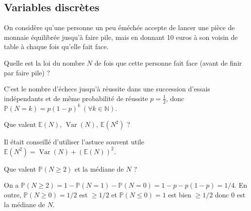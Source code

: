 \subsection{Variables discrètes}

On considère qu'une personne un peu éméchée accepte de lancer une pièce de monnaie équilibrée jusqu'à faire pile, mais en donnant 10 euros à son voisin de table à chaque fois qu'elle fait face.

\begin{question}
Quelle est la loi du nombre $N$ de fois que cette personne fait face (avant de finir par faire pile) ?
\begin{answers}
\end{answers}
\begin{explanations}
C'est le nombre d'échecs jusqu'à  réussite dans une succession d'essais indépendants et de même probabilité de réussite $p=\frac 1 2$, donc $\mathbb{P}(N=k)=p(1-p)^{k} \ (\forall k\in\mathbb{N})$.
\end{explanations}
\end{question}


\begin{question}
Que valent $\mathbb{E}(N)$, $\operatorname{Var}(N)$, $\mathbb{E}(N^2)$ ? 
\begin{answers}
\end{answers}
\begin{explanations}
Il était conseillé  d'utiliser l'astuce souvent utile $\mathbb{E}(N^2)=\operatorname{Var}(N)+(\mathbb{E}(N))^2$. 
\end{explanations}
\end{question}


\begin{question}
Que valent $\mathbb{P}(N\geq 2)$ et la médiane de $N$ ?
\begin{answers}
\end{answers}
\begin{explanations} On a $\mathbb{P}(N\geq 2) = 1-\mathbb{P}(N=1)-\mathbb{P}(N=0) = 1 - p - p(1-p) = 1/4$. En outre, $\mathbb{P}(N\geq 0)=1/2$ est $\geq 1/2$ et $\mathbb{P}(N\leq 0)=1$ est bien $\geq 1/2$ donc $0$ est la médiane de $N$.
\end{explanations}
\end{question}


